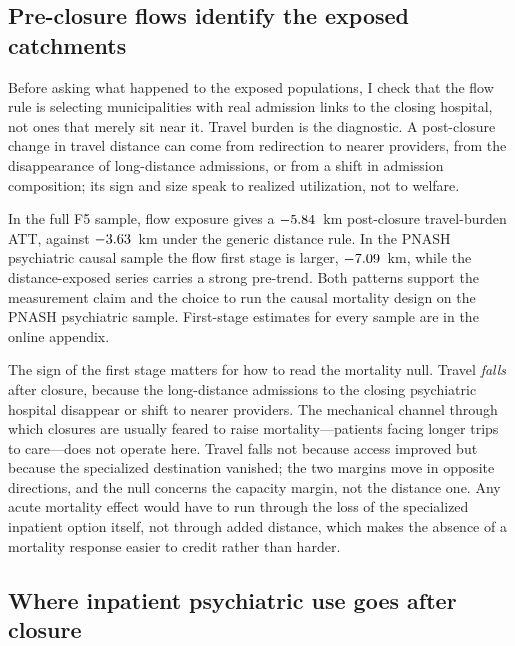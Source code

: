 \subsection{Pre-closure flows identify the exposed catchments}
\label{sec:results-firststage}

Before asking what happened to the exposed populations, I check that the
flow rule is selecting municipalities with real admission links to the
closing hospital, not ones that merely sit near it. Travel burden is the
diagnostic. A post-closure change in travel distance can come from
redirection to nearer providers, from the disappearance of long-distance
admissions, or from a shift in admission composition; its sign and size
speak to realized utilization, not to welfare.

In the full F5 sample, flow exposure gives a $-5.84$~km
post-closure travel-burden ATT, against $-3.63$~km under the
generic distance rule. In
the PNASH psychiatric causal sample the flow first stage is larger,
$-7.09$~km, while the distance-exposed series carries a strong pre-trend.
Both patterns support the measurement claim and the choice to run the causal
mortality design on the PNASH psychiatric sample. First-stage estimates
for every sample are in the online appendix.

The sign of the first stage matters for how to read the mortality null.
Travel \emph{falls} after closure, because the long-distance admissions
to the closing psychiatric hospital disappear or shift to nearer
providers. The mechanical channel through which closures are usually
feared to raise mortality---patients facing longer trips to care---does
not operate here. Travel falls not because access improved but because the specialized destination vanished; the two margins move in opposite directions, and the null concerns the capacity margin, not the distance one. Any acute mortality effect would have to run through the
loss of the specialized inpatient option itself, not through added
distance, which makes the absence of a mortality response easier to
credit rather than harder.

\subsection{Where inpatient psychiatric use goes after closure}
\label{sec:results-utilization}

